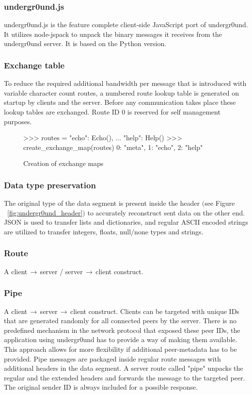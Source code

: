\documentclass[conference]{IEEEtran}
\begin{document}
\subsubsection{undergr0und.js}
undergr0und.js is the feature complete client-side JavaScript port of undergr0und. It utilizes node-jspack to unpack the binary messages it receives from the undergr0und server. It is based on the Python version.

\subsubsection{Exchange table}
To reduce the required additional bandwidth per message that is introduced with variable character count routes, a numbered route lookup table is generated on startup by clients and the server. Before any communication takes place these lookup tables are exchanged. Route ID 0 is reserved for self management purposes.

\begin{figure}[H]
\centering
\begin{python}
>>> routes = {"echo": Echo(),
...    "help": Help()}
>>> create_exchange_map(routes)
{0: "meta", 1: "echo", 2: "help"}
\end{python}
\caption{Creation of exchange maps}
\end{figure}

\subsubsection{Data type preservation}
The original type of the data segment is present inside the header $($see Figure ~\ref{fig:undergr0und_header}$)$ to accurately reconstruct sent data on the other end. JSON\cite{JSON:T. Bray Ed.} is used to transfer lists and dictionaries, and regular ASCII encoded strings are utilized to transfer integers, floats, null/none types and strings.

\subsubsection{Route}
A client$\,\to\,$server / server$\,\to\,$client construct.

\subsubsection{Pipe}
A client$\,\to\,$server$\,\to\,$client construct. Clients can be targeted with unique IDs that are generated randomly for all connected peers by the server. There is no predefined mechanism in the network protocol that exposed these peer IDs, the application using undergr0und\cite{undergr0und:Philip Trauner} has to provide a way of making them available. This approach allows for more flexibility if additional peer-metadata has to be provided.
Pipe messages are packaged inside regular route messages with additional headers in the data segment. A server route called {\color{deepgreen}"pipe"} unpacks the regular and the extended headers and forwards the message to the targeted peer. The original sender ID is always included for a possible response.
\end{document}
